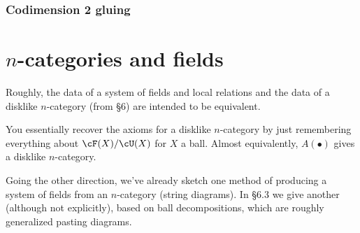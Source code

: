 \documentclass[11pt]{amsart}
\theoremstyle{plain}
\begin{document}
\subsubsection{Codimension 2 gluing}

\section{$n$-categories and fields}
Roughly, the data of a system of fields and local relations and the data of a disklike $n$-category (from \S 6) are intended to be equivalent.

You essentially recover the axioms for a disklike $n$-category by just remembering everything about $\cF(X) / \cU(X)$ for $X$ a ball. 
Almost equivalently, $A(\bullet)$ gives a disklike $n$-category.

Going the other direction, we've already sketch one method of producing a system of fields from an $n$-category (string diagrams). In \S 6.3 we give another (although not explicitly), based on ball decompositions, which are roughly generalized pasting diagrams.
\end{document}
